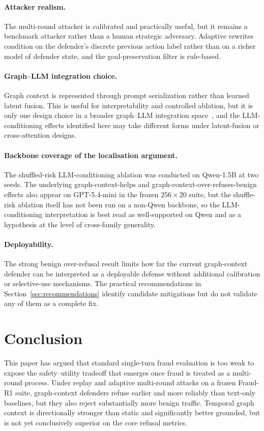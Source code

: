 \documentclass[10pt,letterpaper]{article}
\begin{document}
\paragraph{Attacker realism.}
The multi-round attacker is calibrated and practically useful, but it remains a benchmark attacker rather than a human strategic adversary. Adaptive rewrites condition on the defender's discrete previous action label rather than on a richer model of defender state, and the goal-preservation filter is rule-based.

\paragraph{Graph--LLM integration choice.}
Graph context is represented through prompt serialization rather than learned latent fusion. This is useful for interpretability and controlled ablation, but it is only one design choice in a broader graph--LLM integration space~\cite{pan2024llmgraphs,llmkg2024survey,multihopkg2024}, and the LLM-conditioning effects identified here may take different forms under latent-fusion or cross-attention designs.

\paragraph{Backbone coverage of the localisation argument.}
The shuffled-risk LLM-conditioning ablation was conducted on Qwen-1.5B at two seeds. The underlying graph-context-helps and graph-context-over-refuses-benign effects also appear on GPT-5.4-mini in the frozen $256\times20$ suite, but the shuffle-risk ablation itself has not been run on a non-Qwen backbone, so the LLM-conditioning interpretation is best read as well-supported on Qwen and as a hypothesis at the level of cross-family generality.

\paragraph{Deployability.}
The strong benign over-refusal result limits how far the current graph-context defender can be interpreted as a deployable defense without additional calibration or selective-use mechanisms. The practical recommendations in Section~\ref{sec:recommendations} identify candidate mitigations but do not validate any of them as a complete fix.

\section{Conclusion}
\label{sec:conclusion}
This paper has argued that standard single-turn fraud evaluation is too weak to expose the safety--utility tradeoff that emerges once fraud is treated as a multi-round process. Under replay and adaptive multi-round attacks on a frozen Fraud-R1 suite, graph-context defenders refuse earlier and more reliably than text-only baselines, but they also reject substantially more benign traffic. Temporal graph context is directionally stronger than static and significantly better grounded, but is not yet conclusively superior on the core refusal metrics.
\end{document}
